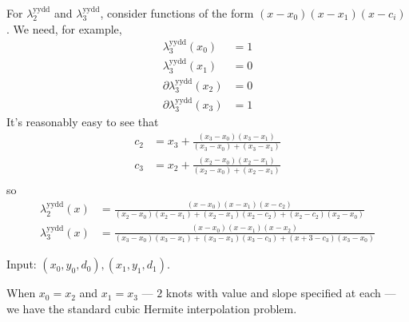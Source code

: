 For $\lambda^{\text{yydd}}_2$ and $\lambda^{\text{yydd}}_3$, 
consider functions of the form $(x-x_0)(x-x_1)(x-c_i)$.
We need, for example, 
\begin{align}
\lambda^{\text{yydd}}_3(x_0) & = 1 \\ 
\lambda^{\text{yydd}}_3(x_1) & = 0 \nonumber \\
\partial\lambda^{\text{yydd}}_3(x_2) & = 0 \nonumber \\
\partial\lambda^{\text{yydd}}_3(x_3) & = 1 \nonumber 
\end{align}
It's reasonably easy to see that 
\begin{align}
c_2 & = x_3 + 
\frac{(x_3 - x_0)(x_3 - x_1)}{(x_3 - x_0) + (x_3 - x_1)} \\
c_3 & = x_2 + 
\frac{(x_2 - x_0)(x_2 - x_1)}{(x_2 - x_0) + (x_2 - x_1)} \\
\end{align}
so
\begin{align}
\lambda^{\text{yydd}}_2(x) & =
\frac{(x-x_0)(x-x_1)(x-c_2)}
{
(x_2-x_0)(x_2-x_1) +
(x_2-x_1)(x_2-c_2) +
(x_2-c_2)(x_2-x_0)}
\\
\lambda^{\text{yydd}}_3(x) & =
\frac{(x-x_0)(x-x_1)(x-x_2)}
{
(x_3-x_0)(x_3-x_1) +
(x_3-x_1)(x_3-c_3) +
(x+3-c_3)(x_3-x_0)}
\nonumber
\end{align}

\label{sec:Lagrange-cubic-hermite}

Input: $(x_0,y_0,d_0), (x_1,y_1,d_1)$.

When $x_0 = x_2$ and $x_1 = x_3$ --- $2$ knots with value and 
slope specified at each --- 
we have the standard cubic Hermite interpolation
problem\cite{wiki:Cubic-hermite-spline}.

